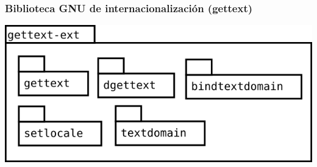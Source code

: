 \subsubsection{Biblioteca GNU de internacionalización (gettext)}
\begin{center}
\includegraphics[scale=0.4]{gettext-ext-package.png} \\
\end{center}

